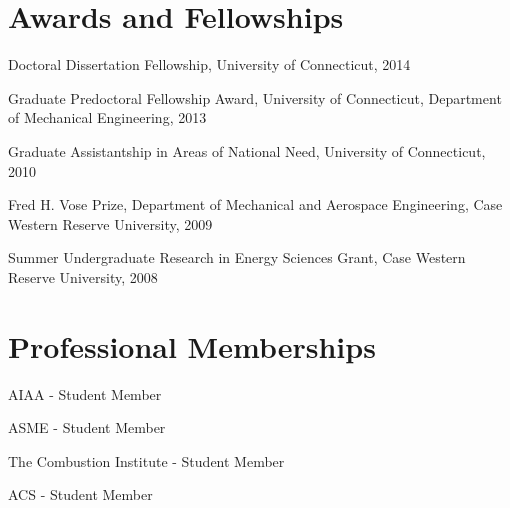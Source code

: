 \vspace{0.5em}

\section{Awards and Fellowships}

Doctoral Dissertation Fellowship, University of Connecticut, 2014

Graduate Predoctoral Fellowship Award, University of Connecticut,
Department of Mechanical Engineering, 2013

Graduate Assistantship in Areas of National
Need, University of Connecticut, 2010

Fred H. Vose Prize, Department of Mechanical and
Aerospace Engineering, Case Western Reserve
University, 2009

Summer Undergraduate Research in Energy Sciences
Grant, Case Western Reserve University, 2008

\section{Professional Memberships}
AIAA - Student Member

ASME - Student Member

The Combustion Institute - Student Member

ACS - Student Member



